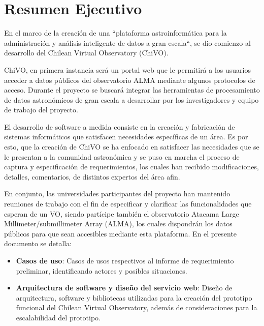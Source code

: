 \section{Resumen Ejecutivo}

En el marco de la creación de una ``plataforma
astroinformática para la administración y análisis inteligente de datos a gran
escala``, se dio comienzo al desarrollo del Chilean Virtual Observatory (ChiVO).

ChiVO, en primera instancia será un portal web que le permitirá a los usuarios
acceder a datos públicos del observatorio ALMA mediante algunos protocolos de
acceso. Durante el proyecto se buscará integrar las herramientas de
procesamiento de datos astronómicos de gran escala a desarrollar por los
investigadores y equipo de trabajo del proyecto.

El desarrollo de software a medida consiste en la creación y fabricación de
sistemas informáticos que satisfacen necesidades específicas de un área. Es por
esto, que la creación de ChiVO se ha enfocado en satisfacer las necesidades que
se le presentan a la comunidad astronómica y se puso en marcha el proceso de
captura y especificación de requerimientos, los cuales han recibido
modificaciones, detalles, comentarios, de distintos expertos del área afin.

En conjunto, las universidades participantes del proyecto han mantenido
reuniones de trabajo con el fin de especificar y clarificar las funcionalidades
que esperan de un VO, siendo partícipe también el observatorio Atacama Large
Millimeter/submillimeter Array (ALMA), los cuales dispondrán los datos públicos
para que sean accesibles mediante esta plataforma. En el presente documento se
detalla:
\begin{itemize}
	\item \textbf{Casos de uso}: Casos de usos respectivos al informe de
requerimiento preliminar, identificando actores y posibles situaciones.
	\item \textbf{Arquitectura de software y diseño del servicio web}: Diseño
de arquitectura, software y bibliotecas utilizadas para la creación del
prototipo funcional del Chilean Virtual Observatory, además de consideraciones
para la escalabilidad del prototipo.
\end{itemize}

